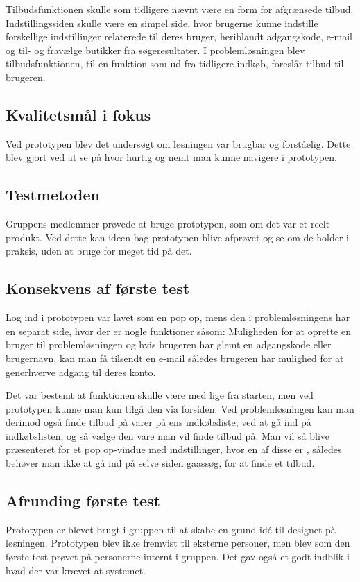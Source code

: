 Tilbudsfunktionen skulle som tidligere nævnt være en form for afgrænsede tilbud. Indstillingssiden skulle være en simpel side, hvor brugerne kunne indstille forskellige indstillinger relaterede til deres bruger, heriblandt adgangskode, e-mail og til- og fravælge butikker fra søgeresultater. I problemløsningen blev tilbudsfunktionen, til en funktion som ud fra tidligere indkøb, foreslår tilbud til brugeren. 

\subsection{Kvalitetsmål i fokus}
Ved prototypen blev det undersøgt om løsningen var brugbar og forståelig. Dette blev gjort ved at se på hvor hurtig og nemt man kunne navigere i prototypen.

\subsection{Testmetoden}
Gruppens medlemmer prøvede at bruge prototypen, som om det var et reelt produkt. Ved dette kan ideen bag prototypen blive afprøvet og se om de holder i praksis, uden at bruge for meget tid på det. 

\subsection{Konsekvens af første test}
Log ind i prototypen var lavet som en pop op, mens den i problemløsningens har en separat side, hvor der er nogle funktioner såsom: Muligheden for at oprette en bruger til problemløsningen og hvis brugeren har glemt en adgangskode eller brugernavn, kan man få tilsendt en e-mail således brugeren har mulighed for at generhverve adgang til deres konto.

Det var bestemt at funktionen  skulle være med lige fra starten, men ved prototypen kunne man kun tilgå den via forsiden. Ved problemløsningen kan man derimod også finde tilbud på varer på ens indkøbsliste, ved at gå ind på indkøbslisten, og så vælge den vare man vil finde tilbud på. Man vil så blive præsenteret for et pop op-vindue med indstillinger, hvor en af disse er , således behøver man ikke at gå ind på selve siden gaas{søg}, for at finde et tilbud.

\subsection{Afrunding første test}
Prototypen er blevet brugt i gruppen til at skabe en grund-idé til designet på løsningen. Prototypen blev ikke fremvist til eksterne personer, men blev som den første test prøvet på personerne internt i gruppen. Det gav også et godt indblik i hvad der var krævet at systemet.